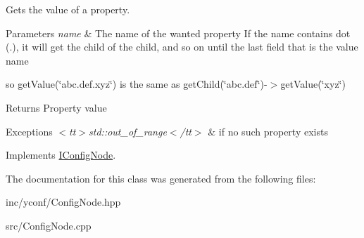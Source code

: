 Gets the value of a property. 


\begin{DoxyParams}{Parameters}
{\em name} & The name of the wanted property If the name contains dot ({\ttfamily .}), it will get the child of the child, and so on until the last field that is the value name\\
\hline
\end{DoxyParams}
so {\ttfamily get\+Value(\char`\"{}abc.\+def.\+xyz\char`\"{})} is the same as {\ttfamily get\+Child(\char`\"{}abc.\+def\char`\"{})-\/$>$get\+Value(\char`\"{}xyz\char`\"{})}

\begin{DoxyReturn}{Returns}
Property value 
\end{DoxyReturn}

\begin{DoxyExceptions}{Exceptions}
{\em $<$tt$>$std\+::out\+\_\+of\+\_\+range$<$/tt$>$} & if no such property exists \\
\hline
\end{DoxyExceptions}


Implements \hyperlink{classIConfigNode_ae32a49d812d3f98cbc048ab3cce5f7d6}{I\+Config\+Node}.



The documentation for this class was generated from the following files\+:\begin{DoxyCompactItemize}
\item 
inc/yconf/Config\+Node.\+hpp\item 
src/Config\+Node.\+cpp\end{DoxyCompactItemize}
